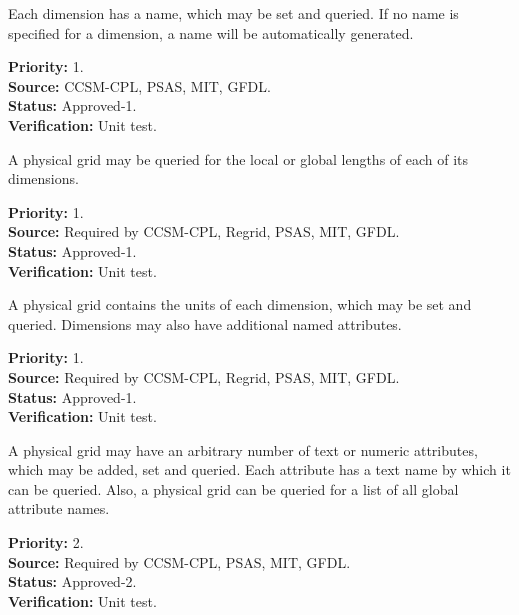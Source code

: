 Each dimension has a name, which may be set and queried.  If no name is specified
for a dimension, a name will be automatically generated.
\begin{reqlist}
{\bf Priority:} 1. \\
{\bf Source:} CCSM-CPL, PSAS, MIT, GFDL. \\
{\bf Status:} Approved-1. \\
{\bf Verification:} Unit test.
\end{reqlist}

A physical grid may be queried for the local or global lengths of each of its dimensions.
\begin{reqlist}
{\bf Priority:} 1. \\
{\bf Source:} Required by CCSM-CPL, Regrid, PSAS, MIT, GFDL. \\
{\bf Status:} Approved-1. \\
{\bf Verification:} Unit test.
\end{reqlist}

A physical grid contains the units of each dimension, which may be set and queried. 
Dimensions may also have additional named attributes.
\begin{reqlist}
{\bf Priority:} 1. \\
{\bf Source:} Required by CCSM-CPL, Regrid, PSAS, MIT, GFDL.  \\
{\bf Status:} Approved-1. \\
{\bf Verification:} Unit test. 
\end{reqlist}

A physical grid may have an arbitrary number of text or numeric attributes,
which may be added, set and queried.  Each attribute has a text name by which it
can be queried.  Also, a physical grid can be queried for a list of all global
attribute names.

\begin{reqlist}
{\bf Priority:} 2. \\
{\bf Source:} Required by CCSM-CPL, PSAS, MIT, GFDL. \\
{\bf Status:} Approved-2. \\
{\bf Verification:} Unit test.
\end{reqlist}

